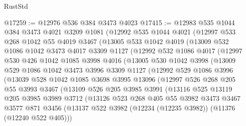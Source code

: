\begin{lexlean}{RustStd}
\begin{coremodule}
{{{{{{{{{{{{{{{{{{{@17259 := @12976 @536 @384 @3473 @4023
@17415 := @12983
    @535
    @1044
    @384
    @3473
    @4021
    @3209
    @1081
    (@12992
      @535
      @1044
      @4021
      (@12997
        @533
        @268
        @1042
        @55
        @4019
        @3467
        (@13005
          @533
          @1042
          @4019
          (@13009
            @532
            @1086
            @1042
            @3473
            @4017
            @3309
            @1127
            (@12992
              @532
              @1086
              @4017
              (@12997
                @530
                @426
                @1042
                @1085
                @3998
                @4016
                (@13005
                  @530
                  @1042
                  @3998
                  (@13009
                    @529
                    @1086
                    @1042
                    @3473
                    @3996
                    @3309
                    @1127
                    (@12992
                      @529
                      @1086
                      @3996
                      (@13039
                        @528
                        @1042
                        @1085
                        @3698
                        @3995
                        @13096
                        (@12997
                          @526
                          @268
                          @205
                          @55
                          @3993
                          @3467
                          (@13109
                            @526
                            @205
                            @3985
                            @3991
                            (@13116
                              @525
                              @13119
                              @205
                              @3985
                              @3989
                              @3712
                              (@13126
                                @523
                                @268
                                @405
                                @55
                                @3982
                                @3473
                                @3467
                                @3577
                                @871
                                @3456
                                (@13137
                                  @522
                                  @3982
                                  (@12234 (@12235 @3982))
                                  (@11376 (@12240 @522 @405)))
}}}}}}}}}}}}}}}}}}}
\end{coremodule}
\end{lexlean}
